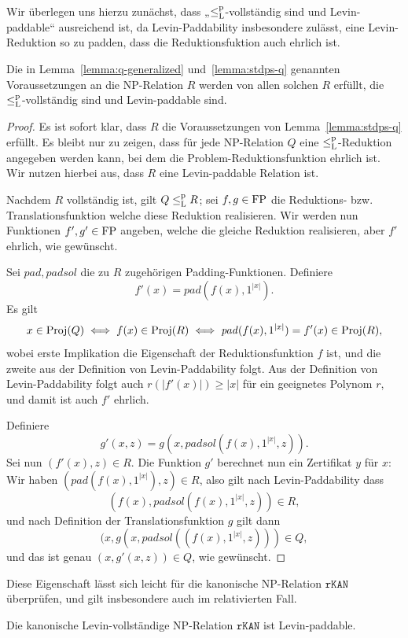 Wir überlegen uns hierzu zunächst, dass „$\leq_\mathrm{L}^\mathrm{p}$-vollständig sind und Levin-paddable“ ausreichend ist, da Levin-Paddability insbesondere zulässt, eine Levin-Reduktion so zu padden, dass die Reduktionsfuktion auch ehrlich ist.
\begin{lemma}
    Die in Lemma~\ref{lemma:q-generalized} und~\ref{lemma:stdps-q} genannten Voraussetzungen an die NP-Relation $R$ werden von allen solchen $R$ erfüllt, die $\leq_\mathrm{L}^\mathrm{p}$-vollständig sind und Levin-paddable sind.
\end{lemma}
\begin{proof}
    Es ist sofort klar, dass $R$ die Voraussetzungen von Lemma~\ref{lemma:stdps-q} erfüllt.
    Es bleibt nur zu zeigen, dass für jede NP-Relation $Q$ eine $\leq_\mathrm{L}^\mathrm{p}$-Reduktion angegeben werden kann, bei dem die Problem-Reduktionsfunktion ehrlich ist.
    Wir nutzen hierbei aus, dass $R$ eine Levin-paddable Relation ist.

    Nachdem $R$ vollständig ist, gilt $Q\leq_\mathrm{L}^\mathrm{p} R$; sei $f,g\in\mathrm{FP}$ die Reduktions- bzw. Translationsfunktion welche diese Reduktion realisieren. Wir werden nun Funktionen $f', g'\in\mathrm{FP}$ angeben, welche die gleiche Reduktion realisieren, aber $f'$ ehrlich, wie gewünscht.

    Sei $\mathit{pad}, \mathit{padsol}$ die zu $R$ zugehörigen Padding-Funktionen. Definiere
    \[ f'(x) = \mathit{pad}(f(x), 1^{|x|}). \]
    Es gilt
    \[ x\in\operatorname{Proj}(Q) \iff f(x)\in \operatorname{Proj}(R) \iff \mathit{pad}(f(x), 1^{|x|})=f'(x)\in\operatorname{Proj}(R), \]
    wobei erste Implikation die Eigenschaft der Reduktionsfunktion $f$ ist, und die zweite aus der Definition von Levin-Paddability folgt.
    Aus der Definition von  Levin-Paddability folgt auch $r(|f'(x)|)\geq |x|$ für ein geeignetes Polynom $r$, und damit ist auch $f'$ ehrlich.

    Definiere
    \[ g'(x, z) = g(x, \mathit{padsol}(f(x), 1^{|x|}, z)). \]
    Sei nun $(f'(x), z)\in R$. Die Funktion $g'$ berechnet nun ein Zertifikat $y$ für $x$: Wir haben $(\mathit{pad}(f(x), 1^{|x|}), z)\in R$, also gilt nach Levin-Paddability dass \[(f(x), \mathit{padsol}(f(x), 1^{|x|}, z))\in R,\] 
    und nach Definition der Translationsfunktion $g$ gilt dann
    \[(x, g(x, \mathit{padsol}((f(x), 1^{|x|}, z)))\in Q,\]
    und das ist genau $(x, g'(x, z))\in Q$, wie gewünscht.
\end{proof}

Diese Eigenschaft lässt sich leicht für die kanonische NP-Relation $\mathtt{rKAN}$ überprüfen, und gilt insbesondere auch im relativierten Fall.
\begin{observation}\label{obs:rkan-paddable}
    Die kanonische Levin-vollständige NP-Relation $\mathtt{rKAN}$ ist Levin-paddable.
\end{observation}

